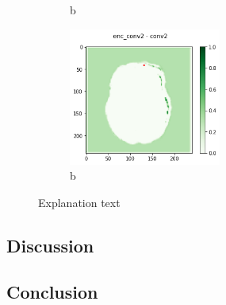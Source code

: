 \begin{figure}[H]
\begin{subfigure}{.25\textwidth}
        \caption{b}
    \end{subfigure}
        \begin{subfigure}{.25\textwidth}
        \centering
        \includegraphics[width=5cm]{chapters/04_segmentation/images/grad_cam_5.png}
        \caption{b}
    \end{subfigure}
    \caption{Explanation text}
\end{figure}

\subsection{Discussion}

\subsection{Conclusion}